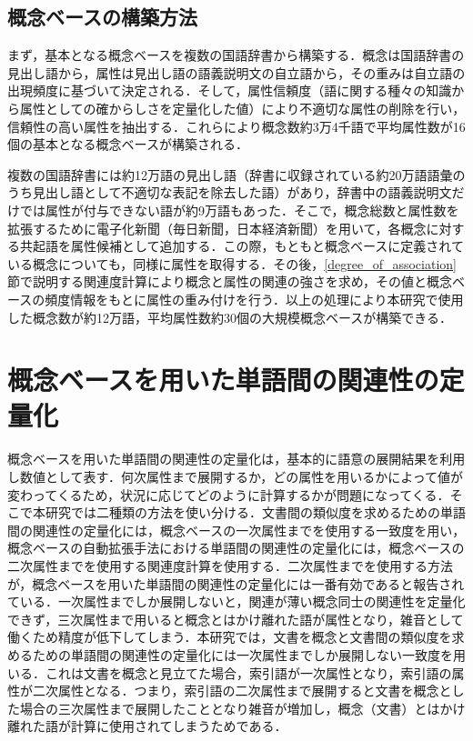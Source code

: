 \documentclass[japanese]{jnlp_1.4}
\begin{document}
\subsection{概念ベースの構築方法}

まず，基本となる概念ベースを複数の国語辞書から構築する．概念は国語辞書の見出し語から，属性は見出し語の語義説明文の自立語から，その重みは自立語の出現頻度に基づいて決定される\cite{kasahara:97}．そして，属性信頼度（語に関する種々の知識から属性としての確からしさを定量化した値）により不適切な属性の削除を行い，信頼性の高い属性を抽出する\cite{kojima:02}．これらにより概念数約3万4千語で平均属性数が16個の基本となる概念ベースが構築される．

複数の国語辞書には約12万語の見出し語（辞書に収録されている約20万語語彙のうち見出し語として不適切な表記を除去した語）があり，辞書中の語義説明文だけでは属性が付与できない語が約9万語もあった．そこで，概念総数と属性数を拡張するために電子化新聞（毎日新聞，日本経済新聞）を用いて，各概念に対する共起語を属性候補として追加する．この際，もともと概念ベースに定義されている概念についても，同様に属性を取得する．その後，\ref{degree_of_association}節で説明する関連度計算により概念と属性の関連の強さを求め，その値と概念ベースの頻度情報をもとに属性の重み付けを行う．以上の処理により本研究で使用した概念数が約12万語，平均属性数約30個の大規模概念ベース\cite{okumura:07}が構築できる．


\section{概念ベースを用いた単語間の関連性の定量化}

概念ベースを用いた単語間の関連性の定量化は，基本的に語意の展開結果を利用し数値として表す．何次属性まで展開するか，どの属性を用いるかによって値が変わってくるため，状況に応じてどのように計算するかが問題になってくる．そこで本研究では二種類の方法を使い分ける．文書間の類似度を求めるための単語間の関連性の定量化には，概念ベースの一次属性までを使用する一致度を用い，概念ベースの自動拡張手法における単語間の関連性の定量化には，概念ベースの二次属性までを使用する関連度計算\cite{watabe:06}を使用する．二次属性までを使用する方法が，概念ベースを用いた単語間の関連性の定量化には一番有効であると報告されている\cite{watabe:06}．一次属性までしか展開しないと，関連が薄い概念同士の関連性を定量化できず，三次属性まで用いると概念とはかけ離れた語が属性となり，雑音として働くため精度が低下してしまう．本研究では，文書を概念と文書間の類似度を求めるための単語間の関連性の定量化には一次属性までしか展開しない一致度を用いる．これは文書を概念と見立てた場合，索引語が一次属性となり，索引語の属性が二次属性となる．つまり，索引語の二次属性まで展開すると文書を概念とした場合の三次属性まで展開したこととなり雑音が増加し，概念（文書）とはかけ離れた語が計算に使用されてしまうためである．
\end{document}
